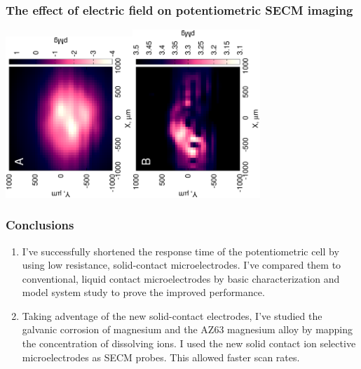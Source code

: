 \documentclass{beamer}
\begin{document}
\begin{frame}
\frametitle{The effect of electric field on potentiometric SECM imaging}
\centering
\includegraphics[trim = 10mm 20mm 0mm 10mm, clip, width=0.36\textwidth, angle=-90]{17012501.eps}\includegraphics[trim = 10mm 20mm 0mm 10mm, clip, width=0.36\textwidth, angle=-90]{17012503_deconvoluted.eps}
\end{frame}

\begin{frame}
\frametitle{Conclusions}
\begin{enumerate}
\item I've successfully shortened the response time of the potentiometric cell by using low resistance, solid-contact microelectrodes.
I've compared them to conventional, liquid contact microelectrodes by basic characterization and model system study to prove the improved performance.

\item Taking adventage of the new solid-contact electrodes, I've studied the galvanic corrosion of magnesium and the AZ63 magnesium alloy by mapping the concentration of dissolving ions.
I used the new solid contact ion selective microelectrodes as SECM probes. This allowed faster scan rates.
\end{enumerate}
\end{frame}
\end{document}
